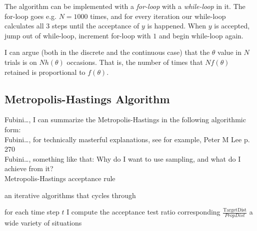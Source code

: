 \documentclass[a4paper,11pt,english]{article}
\begin{document}
			The algorithm can be implemented with a \textit{for-loop} with a \textit{while-loop} in it. The for-loop goes e.g. $N=1000$ times, and for 
			every iteration our while-loop calculates all 3 steps until the acceptance of $y$ is happened. When $y$ is accepted, jump out of while-loop, 
			increment for-loop with $1$ and begin while-loop again. 
	
			I can argue (both in the discrete and the continuous case) that the $\theta$ value in $N$ trials is on $Nh(\theta)$ 
			occasions. That is, the number of times that $Nf(\theta)$ retained is proportional to $f(\theta)$.

		
			\subsection{Metropolis-Hastings Algorithm}
			
			Fubini\ldots, I can summarize the Metropolis-Hastings in the following algorithmic form: \\
	
			\noindent Fubini\ldots, for technically masterful explanations, see for example, Peter M Lee p. 270\\
			
			\noindent Fubini\ldots, something like that: Why do I want to use sampling, and what do I achieve from it? \\
			
			Metropolis-Hastings acceptance rule				
			
			an iterative algorithms that cycles through			
			

			for each time step $t$ I compute the acceptance test ratio corresponding $\frac{\text{TargetDist}}{PropDist}$
			a wide variety of situations
\end{document}
